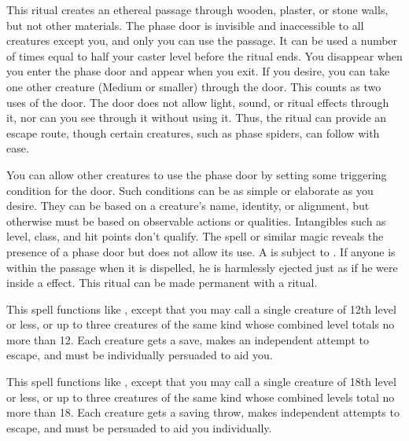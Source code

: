 \spelleffect This ritual creates an ethereal passage through wooden, plaster, or stone walls, but not other materials. The phase door is invisible and inaccessible to all creatures except you, and only you can use the passage. It can be used a number of times equal to half your caster level before the ritual ends. You disappear when you enter the phase door and appear when you exit. If you desire, you can take one other creature (Medium or smaller) through the door. This counts as two uses of the door. The door does not allow light, sound, or ritual effects through it, nor can you see through it without using it. Thus, the ritual can provide an escape route, though certain creatures, such as phase spiders, can follow with ease.
\par You can allow other creatures to use the phase door by setting some triggering condition for the door. Such conditions can be as simple or elaborate as you desire. They can be based on a creature's name, identity, or alignment, but otherwise must be based on observable actions or qualities. Intangibles such as level, class, and hit points don't qualify.
\spellnotes The  spell or similar magic reveals the presence of a phase door but does not allow its use. A  is subject to . If anyone is within the passage when it is dispelled, he is harmlessly ejected just as if he were inside a  effect. This ritual can be made permanent with a  ritual.

\spelleffect This spell functions like , except that you may call a single creature of 12th level or less, or up to three creatures of the same kind whose combined level totals no more than 12. Each creature gets a save, makes an independent attempt to escape, and must be individually persuaded to aid you.

\spelleffect This spell functions like , except that you may call a single creature of 18th level or less, or up to three creatures of the same kind whose combined levels total no more than 18. Each creature gets a saving throw, makes independent attempts to escape, and must be persuaded to aid you individually.

